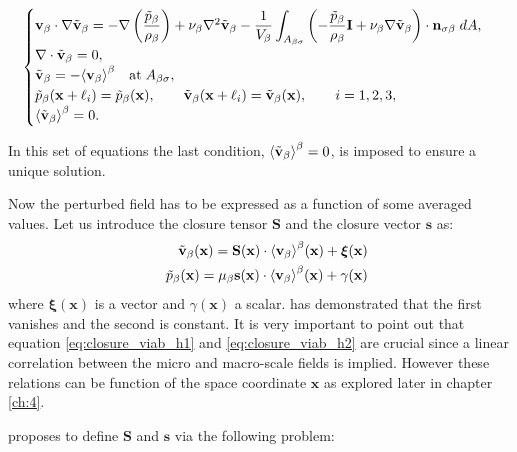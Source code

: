 \begin{eqnarray}
\begin{cases}
\textbf{v}_{\beta} \cdot \nabla \tilde{\textbf{v}}_{\beta} = -\nabla \left(\dfrac{\tilde{p}_{\beta}}{\rho_{\beta}}\right) + \nu_{\beta} \nabla^2 \tilde{\textbf{v}}_{\beta} - \dfrac{1}{V_\beta} \displaystyle \int_{A_{\beta \sigma}} \left(-\dfrac{\tilde{p}_{\beta}}{\rho_{\beta}} \mathbf{I}  + \nu_{\beta} \nabla \tilde{\textbf{v}}_{\beta} \right) \cdot \mathbf{n}_{\sigma \beta} \;dA,  \\
\nabla \cdot \tilde{\textbf{v}}_{\beta} = 0, \\
\tilde{\textbf{v}}_{\beta} = -{\left< \textbf{v}_{\beta} \right>}^{\beta} \quad \textrm{at} \; A_{\beta \sigma}, \\
\tilde{p}_{\beta}(\mathbf{x} +\ell_i) = \tilde{p}_{\beta}(\mathbf{x}), \qquad \tilde{\textbf{v}}_{\beta}(\mathbf{x} +\ell_i) = \tilde{\textbf{v}}_{\beta}(\mathbf{x}), \qquad i=1,2,3 ,\\
{\left< \tilde{\textbf{v}}_{\beta} \right>}^{\beta} = 0.
\end{cases}
\label{eq:vans_mom_2}
\end{eqnarray}

In this set of equations the last condition, ${\left< \tilde{\textbf{v}}_{\beta} \right>}^{\beta} = 0$, is imposed to ensure a unique solution.

Now the perturbed field has to be expressed as a function of some averaged values. Let us introduce the closure tensor $\mathbf{S}$ and  the closure vector $\mathbf{s}$ as:
\begin{eqnarray}
&& \tilde{\textbf{v}}_{\beta}(\mathbf{x}) = \mathbf{S}(\mathbf{x})  \cdot {\left< \textbf{v}_{\beta}\right>}^{\beta}(\mathbf{x})  +\boldsymbol{\xi}(\mathbf{x})  	\label{eq:closure_viab_h1} \\
&& \tilde{p}_{\beta}(\mathbf{x})  = \mu_{\beta} \mathbf{s}(\mathbf{x})  \cdot {\left< \textbf{v}_{\beta}\right>}^{\beta}(\mathbf{x})  + \gamma(\mathbf{x}) \label{eq:closure_viab_h2}
\end{eqnarray}
where $\boldsymbol{\xi}(\mathbf{x})$ is a vector and $\gamma(\mathbf{x})$ a scalar. \citet{whitaker1996forchheimer} has demonstrated that the first vanishes and the second is constant.
It is very important to point out that equation \eqref{eq:closure_viab_h1} and \eqref{eq:closure_viab_h2} are crucial since a linear correlation between the micro and macro-scale fields is implied.
However these relations can be function of the space coordinate $\mathbf{x}$ as explored later in chapter \ref{ch:4}.

\citet{whitaker1996forchheimer} proposes to define $\mathbf{S}$ and $\mathbf{s}$ via the following problem:

